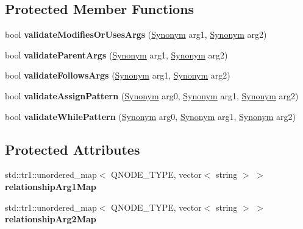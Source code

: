 \subsection*{Protected Member Functions}
\begin{DoxyCompactItemize}
\item 
\hypertarget{class_query_validator_a890cac207bf194b813c5737ea0910922}{}bool {\bfseries validate\+Modifies\+Or\+Uses\+Args} (\hyperlink{class_synonym}{Synonym} arg1, \hyperlink{class_synonym}{Synonym} arg2)\label{class_query_validator_a890cac207bf194b813c5737ea0910922}

\item 
\hypertarget{class_query_validator_a5fa1b6d7f39876ee537737fca0ba8364}{}bool {\bfseries validate\+Parent\+Args} (\hyperlink{class_synonym}{Synonym} arg1, \hyperlink{class_synonym}{Synonym} arg2)\label{class_query_validator_a5fa1b6d7f39876ee537737fca0ba8364}

\item 
\hypertarget{class_query_validator_aca252eb590c5dde784abe8204ddfbeb4}{}bool {\bfseries validate\+Follows\+Args} (\hyperlink{class_synonym}{Synonym} arg1, \hyperlink{class_synonym}{Synonym} arg2)\label{class_query_validator_aca252eb590c5dde784abe8204ddfbeb4}

\item 
\hypertarget{class_query_validator_a9307e2b18213199f7784675a384394a0}{}bool {\bfseries validate\+Assign\+Pattern} (\hyperlink{class_synonym}{Synonym} arg0, \hyperlink{class_synonym}{Synonym} arg1, \hyperlink{class_synonym}{Synonym} arg2)\label{class_query_validator_a9307e2b18213199f7784675a384394a0}

\item 
\hypertarget{class_query_validator_a6168a1a0e930d4459dc5fda460b7db58}{}bool {\bfseries validate\+While\+Pattern} (\hyperlink{class_synonym}{Synonym} arg0, \hyperlink{class_synonym}{Synonym} arg1, \hyperlink{class_synonym}{Synonym} arg2)\label{class_query_validator_a6168a1a0e930d4459dc5fda460b7db58}

\end{DoxyCompactItemize}
\subsection*{Protected Attributes}
\begin{DoxyCompactItemize}
\item 
\hypertarget{class_query_validator_a55d7e52c4e3d94089dfae299f3af3118}{}std\+::tr1\+::unordered\+\_\+map$<$ Q\+N\+O\+D\+E\+\_\+\+T\+Y\+P\+E, vector$<$ string $>$ $>$ {\bfseries relationship\+Arg1\+Map}\label{class_query_validator_a55d7e52c4e3d94089dfae299f3af3118}

\item 
\hypertarget{class_query_validator_a3d760432e1436aa810966279998d6e60}{}std\+::tr1\+::unordered\+\_\+map$<$ Q\+N\+O\+D\+E\+\_\+\+T\+Y\+P\+E, vector$<$ string $>$ $>$ {\bfseries relationship\+Arg2\+Map}\label{class_query_validator_a3d760432e1436aa810966279998d6e60}

\end{DoxyCompactItemize}


